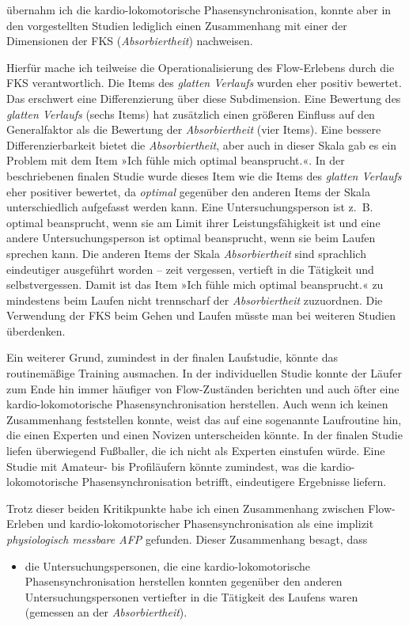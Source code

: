 übernahm ich die kardio-lokomotorische Phasensynchronisation, konnte aber in den vorgestellten Studien lediglich einen Zusammenhang mit einer der Dimensionen der \ac{FKS} (\emph{Absorbiertheit}) nachweisen.

Hierfür mache ich teilweise die Operationalisierung des Flow-Erlebens durch die \ac{FKS} verantwortlich. Die Items des \emph{glatten Verlaufs} wurden eher positiv bewertet. Das erschwert eine Differenzierung über diese Subdimension. Eine Bewertung des \emph{glatten Verlaufs} (sechs Items) hat zusätzlich einen größeren Einfluss auf den Generalfaktor als die Bewertung der \emph{Absorbiertheit} (vier Items). Eine bessere Differenzierbarkeit bietet die \emph{Absorbiertheit}, aber auch in dieser Skala gab es ein Problem mit dem Item »Ich fühle mich optimal beansprucht.«. In der beschriebenen finalen Studie wurde dieses Item wie die Items des \emph{glatten Verlaufs} eher positiver bewertet, da \emph{optimal} gegenüber den anderen Items der Skala unterschiedlich aufgefasst werden kann. Eine Untersuchungsperson ist z.~B. optimal beansprucht, wenn sie am Limit ihrer Leistungsfähigkeit ist und eine andere Untersuchungsperson ist optimal beansprucht, wenn sie beim Laufen sprechen kann. Die anderen Items der Skala \emph{Absorbiertheit} sind sprachlich eindeutiger ausgeführt worden -- zeit vergessen, vertieft in die Tätigkeit und selbstvergessen. Damit ist das Item »Ich fühle mich optimal beansprucht.« zu mindestens beim Laufen nicht trennscharf der \emph{Absorbiertheit} zuzuordnen. Die Verwendung der \ac{FKS} beim Gehen und Laufen müsste man bei weiteren Studien überdenken.

Ein weiterer Grund, zumindest in der finalen Laufstudie, könnte das routinemäßige Training ausmachen. In der individuellen Studie konnte der Läufer zum Ende hin immer häufiger von Flow-Zuständen berichten und auch öfter eine kardio-lokomotorische Phasensynchronisation herstellen. Auch wenn ich keinen Zusammenhang feststellen konnte, weist das auf eine sogenannte Laufroutine hin, die einen Experten und einen Novizen unterscheiden könnte. In der finalen Studie liefen überwiegend Fußballer, die ich nicht als Experten einstufen würde. Eine Studie mit Amateur- bis Profiläufern könnte zumindest, was die kardio-lokomotorische Phasensynchronisation betrifft, eindeutigere Ergebnisse liefern.

Trotz dieser beiden Kritikpunkte habe ich einen Zusammenhang zwischen Flow-Erleben und kardio-lokomotorischer Phasensynchronisation als eine implizit \emph{physiologisch messbare \ac{AFP}} gefunden. Dieser Zusammenhang besagt, dass 
\begin{itemize}
	
	\item die Untersuchungspersonen, die eine kardio-lokomotorische Phasensynchronisation herstellen konnten gegenüber den anderen Untersuchungspersonen vertiefter in die Tätigkeit des Laufens waren (gemessen an der \emph{Absorbiertheit}).
\end{itemize}

